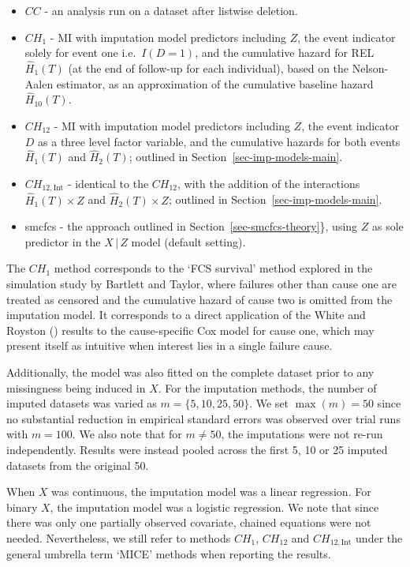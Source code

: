\documentclass[
  letterpaper,
  DIV=11,
  numbers=noendperiod]{scrreprt}
\newcommand{\given}{\,|\,}
\begin{document}
\begin{itemize}
\item
  \(CC\) - an analysis run on a dataset after listwise deletion.
\item
  \(CH_{1}\) - MI with imputation model predictors including \(Z\), the
  event indicator solely for event one i.e.~\(I(D = 1)\), and the
  cumulative hazard for REL \(\hat{H}_{1}(T)\) (at the end of follow-up
  for each individual), based on the Nelson-Aalen estimator, as an
  approximation of the cumulative baseline hazard \(\hat{H}_{10}(T)\).
\item
  \(CH_{12}\) - MI with imputation model predictors including \(Z\), the
  event indicator \(D\) as a three level factor variable, and the
  cumulative hazards for both events \(\hat{H}_{1}(T)\) and
  \(\hat{H}_{2}(T)\); outlined in Section~\ref{sec-imp-models-main}.
\item
  \(CH_{12,\text{Int}}\) - identical to the \(CH_{12}\), with the
  addition of the interactions \(\hat{H}_{1}(T) \times Z\) and
  \(\hat{H}_{2}(T) \times Z\); outlined in
  Section~\ref{sec-imp-models-main}.
\item
  smcfcs - the approach outlined in Section~\ref{sec-smcfcs-theory}\},
  using \(Z\) as sole predictor in the \(X \given Z\) model (default
  setting).
\end{itemize}

The \(CH_{1}\) method corresponds to the `FCS survival' method explored
in the simulation study by Bartlett and Taylor, where failures other
than cause one are treated as censored and the cumulative hazard of
cause two is omitted from the imputation model. It corresponds to a
direct application of the White and Royston
() results to the
cause-specific Cox model for cause one, which may present itself as
intuitive when interest lies in a single failure cause.

Additionally, the model was also fitted on the complete dataset prior to
any missingness being induced in \(X\). For the imputation methods, the
number of imputed datasets was varied as \(m = \{5, 10, 25, 50\}\). We
set \(\max(m) = 50\) since no substantial reduction in empirical
standard errors was observed over trial runs with \(m = 100\). We also
note that for \(m \neq 50\), the imputations were not re-run
independently. Results were instead pooled across the first 5, 10 or 25
imputed datasets from the original 50.

When \(X\) was continuous, the imputation model was a linear regression.
For binary \(X\), the imputation model was a logistic regression. We
note that since there was only one partially observed covariate, chained
equations were not needed. Nevertheless, we still refer to methods
\(CH_{1}\), \(CH_{12}\) and \(CH_{12,\text{Int}}\) under the general
umbrella term `MICE' methods when reporting the results.
\end{document}
